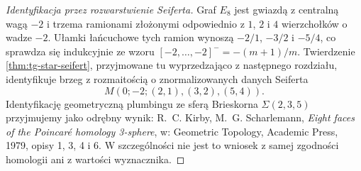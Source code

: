 \begin{proof}[Identyfikacja przez rozwarstwienie Seiferta]
Graf $E_8$ jest gwiazdą z centralną wagą $-2$ i trzema
ramionami złożonymi odpowiednio z $1$, $2$ i $4$
wierzchołków o wadze $-2$. Ułamki łańcuchowe tych ramion
wynoszą $-2/1$, $-3/2$ i $-5/4$, co sprawdza się
indukcyjnie ze wzoru $[-2,\ldots,-2]^-=-(m+1)/m$.
Twierdzenie \ref{thm:tg-star-seifert},
przyjmowane tu wyprzedzająco z następnego rozdziału,
identyfikuje brzeg z rozmaitością o znormalizowanych
danych Seiferta
\[
M(0;-2;(2,1),(3,2),(5,4)).
\]
Identyfikację geometryczną plumbingu ze sferą
Brieskorna $\Sigma(2,3,5)$ przyjmujemy jako
odrębny wynik: R.~C. Kirby, M.~G. Scharlemann,
\emph{Eight faces of the Poincaré homology 3-sphere},
w: Geometric Topology, Academic Press, 1979,
opisy 1, 3, 4 i 6. W szczególności nie jest to
wniosek z samej zgodności homologii ani
z wartości wyznacznika.


\end{proof}
